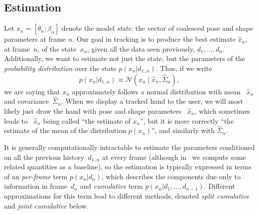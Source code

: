 \subsection*{Estimation}
Let $x_n = [\theta_n; \beta_n]$ denote the model {\em state}: the vector of coalesced pose and shape parameters at frame $n$.  
Our goal in tracking is to produce the best estimate $\hat{x}_n$, at frame~$n$, of the state~$x_n$, given all the data seen previously, $d_1, ..., d_n$.
Additionally, we want to estimate not just the state, but the parameters of the {\em probability distribution} over the state $p(x_n|d_{1..n})$.  Thus, if we write
\begin{equation}
p(x_n|d_{1..n}) \approx \mathcal N(x_n \mid \hat{x}_n, \hat{\Sigma}_n),
\end{equation}
we are saying that $x_n$ approximately follows a normal distribution with mean ~$\hat x_n$ and covariance~$\hat\Sigma_n$.  When we display a tracked hand to the user, we will most likely just draw the hand with pose and shape parameters~ $\hat x_n$, which sometimes leads to ~$\hat x_n$ being called ``the estimate of $x_n$'', but it is more correctly ``the estimate of the mean of the distribution $p(x_n)$'', and similarly with $\hat\Sigma_n$.

It is generally computationally intractable to estimate the parameters conditioned on all the previous history~$d_{1..n}$ at every frame (although in~ we compute some related quantities as a baseline), so the estimation is typically expressed in terms of an {\em per-frame} term $p(x_n|d_n)$, which describes the components due only to information in frame~$d_n$ and {\em cumulative} term $p(x_n|d_1, ..., d_{n-1})$.  Different approximations for this term lead to different methods, denoted {\em split cumulative} and {\em joint cumulative} below.


